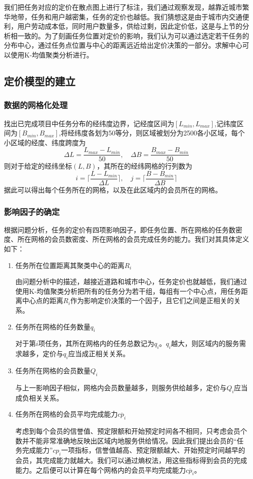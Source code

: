 \documentclass[withoutpreface,bwprint]{cumcmthesis} %
\begin{document}
我们把任务对应的定价在散点图上进行了标注，我们通过观察发现，越靠近城市繁华地带，任务和用户越密集，任务的定价也越低。我们猜想这是由于城市内交通便利，用户劳动成本低，同时用户数量多，供给过剩，因此定价低，这是与上节的分析相一致的。为了刻画任务位置对定价的影响，我们认为可以通过选定若干任务的分布中心，通过任务点位置与中心的距离远近给出定价决策的一部分。求解中心可以使用K-均值聚类分析进行。

\subsection{定价模型的建立}

\subsubsection{数据的网格化处理}
找出已完成项目中任务分布的经纬度边界，记经度区间为$[L_{min},L_{max}]$,记纬度区间为$[B_{min},B_{max}]$,将经纬度各划为50等分，则区域被划分为2500各小区域，每个小区域的经度、纬度跨度为$$\Delta L=\frac{L_{max}-L_{min}}{50},\quad \Delta B=\frac{B_{max}-B_{min}}{50}$$则对于给定的经纬坐标$(L,B)$，其所在的经纬网格的行列数为$$i=\lceil \frac{L-L_{min}}{\Delta L}\rceil,\quad j=\lceil \frac{B-B_{min}}{\Delta B}\rceil$$据此可以得出每个任务所在的网格，以及在此区域内的会员所在的网格。

\subsubsection{影响因子的确定}
根据问题分析，任务的定价有四项影响因子，即任务位置、所在网格的任务数密度、所在网格的会员数密度、所在网格的会员完成任务的能力。我们对其具体定义如下：
\begin{enumerate}
    \item 任务所在位置距离其聚类中心的距离$R_i$

    由问题分析中的描述，越接近道路和城市中心，任务定价也就越低，我们通过使用K-均值聚类分析把所有的任务分为若干组，每组有一个中心点，用任务距离中心点的距离$R_i$作为影响定价决策的一个因子，且它们之间是正相关的关系。
    \item 任务所在网格的任务数量$q_i$
    
    对于第$i$项任务，其所在网格内的任务总数记为$q_i$。$q_i$越大，则区域内的服务需求越多，定价与$q_i$应当成正相关关系。
    \item 任务所在网格的会员数量$Q_i$
    
    与上一影响因子相似，网格内会员数量越多，则服务供给越多，定价与$Q_i$应当成负相关关系。
    \item 任务所在网格的会员平均完成能力$\overline{cp_i}$
    
    考虑到每个会员的信誉值、预定限额和开始预定时间各不相同，只考虑会员个数并不能非常准确地反映出区域内地服务供给情况。因此我们提出会员的“任务完成能力”$cp_i$一项指标，信誉值越高、预定限额越大、开始预定时间越早的会员，其完成能力就越大。我们可以通过熵权法，用这些指标得到会员的完成能力。之后便可以计算在每个网格内的会员平均完成能力$\overline{cp_i}$。
\end{enumerate}
\end{document}
